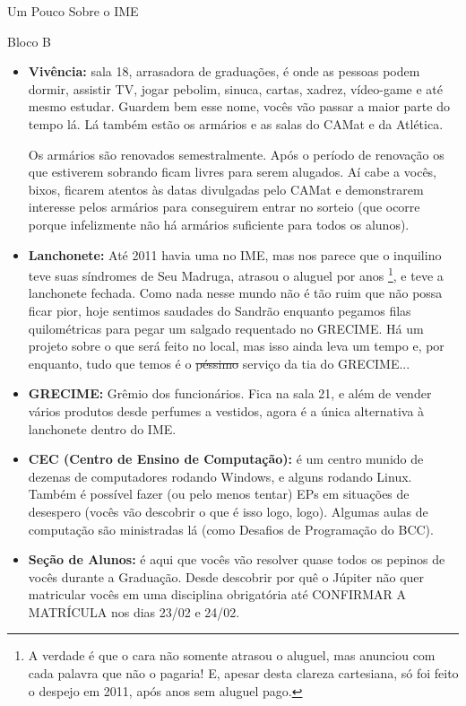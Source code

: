 \begin{secao}{Um Pouco Sobre o IME}
\begin{subsecao}{Bloco B}
\begin{itemize}
\item {\bf Vivência:} sala 18, arrasadora de graduações, é onde as pessoas podem 
dormir, assistir TV, jogar pebolim, sinuca, cartas, xadrez, vídeo-game e até 
mesmo estudar. Guardem bem esse nome, vocês vão passar a maior parte do tempo lá. 
Lá também estão os armários e as salas do CAMat e da Atlética.

Os armários são renovados semestralmente. Após o período de renovação os que 
estiverem sobrando ficam livres para serem alugados. Aí cabe a vocês, bixos, ficarem 
atentos às datas divulgadas pelo CAMat e demonstrarem interesse pelos armários para 
conseguirem entrar no sorteio (que ocorre porque infelizmente não há armários 
suficiente para todos os alunos).

\item {\bf Lanchonete:} Até 2011 havia uma no IME, mas nos parece que o inquilino
teve suas síndromes de Seu Madruga, atrasou o aluguel por anos \footnote{A verdade 
é que o cara não somente atrasou o aluguel, mas anunciou com cada palavra que não 
o pagaria! E, apesar desta clareza cartesiana, só foi feito o despejo em 2011, 
após anos sem aluguel pago.}, e teve a lanchonete fechada. Como nada nesse
mundo não é tão ruim que não possa ficar pior, hoje sentimos saudades do Sandrão
enquanto pegamos filas quilométricas para pegar um salgado requentado no GRECIME.
Há um projeto sobre o que será feito no local, mas isso ainda leva um tempo e, 
por enquanto, tudo que temos é o \sout{péssimo} serviço da tia do GRECIME... 

\item {\bf GRECIME:} Grêmio dos funcionários. Fica na sala 21, e além de vender
vários produtos desde perfumes a vestidos, agora é a única alternativa à
lanchonete dentro do IME.

\item {\bf CEC (Centro de Ensino de Computação):} é um centro munido de dezenas
de computadores rodando Windows, e alguns rodando Linux. Também é possível fazer 
(ou pelo menos tentar) EPs em situações de desespero (vocês vão descobrir o que é 
isso logo, logo). Algumas aulas de computação são ministradas lá (como Desafios 
de Programação do BCC).
 
\item {\bf Seção de Alunos:} é aqui que vocês vão resolver quase todos os pepinos 
de vocês durante a Graduação. Desde descobrir por quê o Júpiter não quer matricular vocês
em uma disciplina obrigatória até CONFIRMAR A MATRÍCULA nos dias 23/02 e 24/02. %


\end{itemize}
\end{subsecao}
\end{secao}

